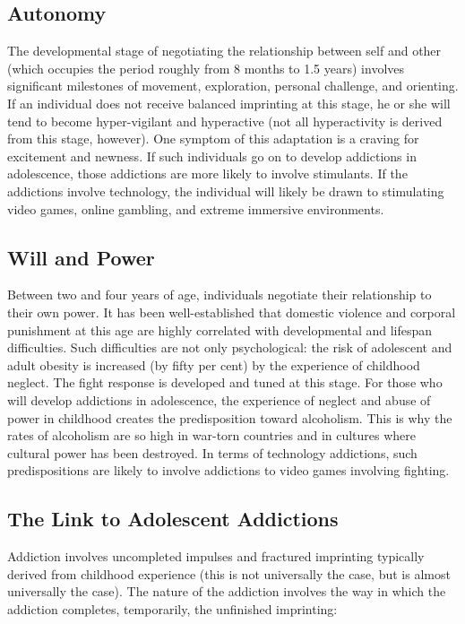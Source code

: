 \documentclass[12pt,DIV9,oneside,headsepline,footsepline]{scrreprt}
\begin{document}
\subsection{Autonomy}

The developmental stage of negotiating the relationship between self
and other (which occupies the period roughly from 8 months to 1.5
years) involves significant milestones of movement, exploration,
personal challenge, and orienting. If an individual does not receive
balanced imprinting at this stage, he or she will tend to become
hyper-vigilant and hyperactive (not all hyperactivity is derived from
this stage, however). One symptom of this adaptation is a craving for
excitement and newness. If such individuals go on to develop
addictions in adolescence, those addictions are more likely to involve
stimulants. If the addictions involve technology, the individual will
likely be drawn to stimulating video games, online gambling, and
extreme immersive environments.

\subsection{Will and Power}

Between two and four years of age, individuals negotiate their
relationship to their own power. It has been well-established that
domestic violence and corporal punishment at this age are highly
correlated with developmental and lifespan difficulties. Such
difficulties are not only psychological: the risk of adolescent and
adult obesity is increased (by fifty per cent) by the experience of
childhood neglect. The fight response is developed and tuned at this
stage. For those who will develop addictions in adolescence, the
experience of neglect and abuse of power in childhood creates the
predisposition toward alcoholism. This is why the rates of alcoholism
are so high in war-torn countries and in cultures where cultural power
has been destroyed. In terms of technology addictions, such
predispositions are likely to involve addictions to video games
involving fighting.

\subsection{The Link to Adolescent Addictions}

Addiction involves uncompleted impulses and fractured imprinting
typically derived from childhood experience (this is not universally
the case, but is almost universally the case). The nature of the
addiction involves the way in which the addiction completes,
temporarily, the unfinished imprinting:
\end{document}
